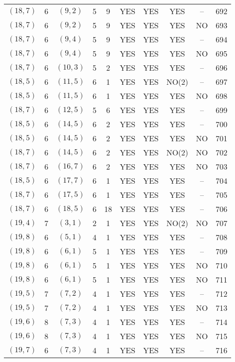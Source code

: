 \begin{longtable}{|c|c|c|c|c|c|c|c|c|c|}
$(18, 7)$ & 6 & $(9, 2)$ & 5 & 9 & YES & YES & YES & -- & 692\\
$(18, 7)$ & 6 & $(9, 2)$ & 5 & 9 & YES & YES & YES & NO & 693\\
$(18, 7)$ & 6 & $(9, 4)$ & 5 & 9 & YES & YES & YES & -- & 694\\
$(18, 7)$ & 6 & $(9, 4)$ & 5 & 9 & YES & YES & YES & NO & 695\\
$(18, 7)$ & 6 & $(10, 3)$ & 5 & 2 & YES & YES & YES & -- & 696\\
$(18, 5)$ & 6 & $(11, 5)$ & 6 & 1 & YES & YES & NO(2) & -- & 697\\
$(18, 5)$ & 6 & $(11, 5)$ & 6 & 1 & YES & YES & YES & NO & 698\\
$(18, 7)$ & 6 & $(12, 5)$ & 5 & 6 & YES & YES & YES & -- & 699\\
$(18, 5)$ & 6 & $(14, 5)$ & 6 & 2 & YES & YES & YES & -- & 700\\
$(18, 5)$ & 6 & $(14, 5)$ & 6 & 2 & YES & YES & YES & NO & 701\\
$(18, 7)$ & 6 & $(14, 5)$ & 6 & 2 & YES & YES & NO(2) & NO & 702\\
$(18, 7)$ & 6 & $(16, 7)$ & 6 & 2 & YES & YES & YES & NO & 703\\
$(18, 5)$ & 6 & $(17, 7)$ & 6 & 1 & YES & YES & YES & -- & 704\\
$(18, 7)$ & 6 & $(17, 5)$ & 6 & 1 & YES & YES & YES & -- & 705\\
$(18, 7)$ & 6 & $(18, 5)$ & 6 & 18 & YES & YES & YES & -- & 706\\
$(19, 4)$ & 7 & $(3, 1)$ & 2 & 1 & YES & YES & NO(2) & NO & 707\\
$(19, 8)$ & 6 & $(5, 1)$ & 4 & 1 & YES & YES & YES & -- & 708\\
$(19, 8)$ & 6 & $(6, 1)$ & 5 & 1 & YES & YES & YES & -- & 709\\
$(19, 8)$ & 6 & $(6, 1)$ & 5 & 1 & YES & YES & YES & NO & 710\\
$(19, 8)$ & 6 & $(6, 1)$ & 5 & 1 & YES & YES & YES & NO & 711\\
$(19, 5)$ & 7 & $(7, 2)$ & 4 & 1 & YES & YES & YES & -- & 712\\
$(19, 5)$ & 7 & $(7, 2)$ & 4 & 1 & YES & YES & YES & NO & 713\\
$(19, 6)$ & 8 & $(7, 3)$ & 4 & 1 & YES & YES & YES & -- & 714\\
$(19, 6)$ & 8 & $(7, 3)$ & 4 & 1 & YES & YES & YES & NO & 715\\
$(19, 7)$ & 6 & $(7, 3)$ & 4 & 1 & YES & YES & YES & -- & 716\\

\end{longtable}
